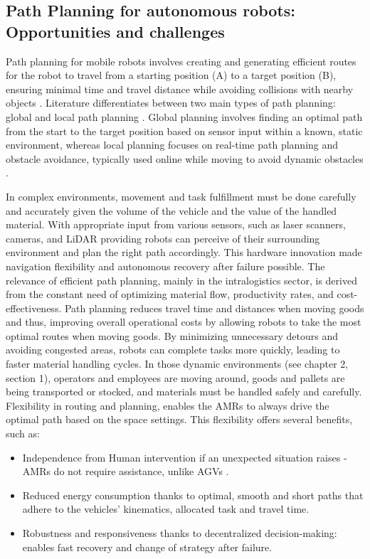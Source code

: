 \subsection{Path Planning for autonomous robots: Opportunities and challenges}
Path planning for mobile robots involves creating and generating efficient routes 
for the robot to travel from a starting position (A) to a target position (B), 
ensuring minimal time and travel distance while avoiding collisions with nearby objects \cite{R7}. Literature 
differentiates between two main types of path planning: 
global and local path planning \cite{R11}. Global planning involves finding an optimal path from 
the start to the target position based on sensor input within a known, static environment, 
whereas local planning focuses on real-time path planning and obstacle avoidance, typically used online while 
moving to avoid dynamic obstacles \cite{R11}.

In complex environments, movement and task fulfillment must be done carefully and accurately given 
the volume of the vehicle and the value of the handled material. With appropriate input from various sensors, 
such as laser 
scanners, cameras, and LiDAR providing robots can perceive of their surrounding environment and plan the right path
accordingly. This hardware innovation made navigation flexibility and autonomous recovery 
after failure possible\cite{R7}.
The relevance of efficient path planning, mainly in the intralogistics sector, is derived from the constant need 
of optimizing material flow, productivity rates, and cost-effectiveness. Path planning reduces
travel time and distances when moving goods and thus, improving overall operational costs by allowing robots 
to take the most optimal routes when moving goods. By minimizing unnecessary detours and avoiding congested areas, 
robots can complete tasks more quickly, leading to faster material handling cycles.
In those dynamic environments (see chapter 2, section 1), operators and employees are moving around, 
goods and pallets are 
being transported or stocked, and materials must be handled safely and carefully.
Flexibility in routing and planning, enables the AMRs to always drive the optimal path
based on the space settings. This flexibility offers several benefits, such as:

\begin{itemize}
    \item Independence from Human intervention if an unexpected situation raises 
    -AMRs do not require assistance, unlike AGVs \cite{R7}.
    \item Reduced energy consumption thanks to optimal, smooth and short paths that adhere to 
    the vehicles' kinematics, allocated task and travel time.
    \item Robustness and responsiveness thanks to decentralized decision-making: enables fast 
    recovery and change of strategy after failure\cite{R7}.
\end{itemize}

